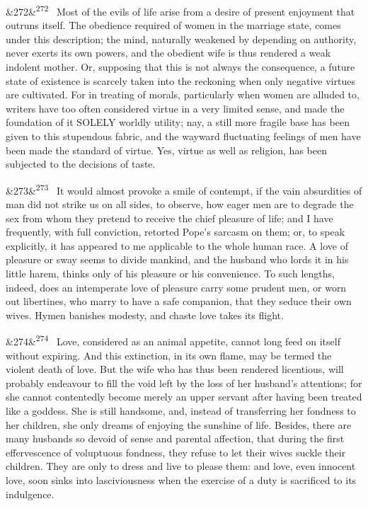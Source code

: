 \documentclass[12pt]{article}
\newcommand{\para}[1][]{\par\noindent\ifx&#1&\else\textsuperscript{\footnotesize #1}~\fi}
\begin{document}
\para[272] Most of the evils of life arise from a desire of present enjoyment that outruns itself. The obedience required of women in the marriage state, comes under this description; the mind, naturally weakened by depending on authority, never exerts its own powers, and the obedient wife is thus rendered a weak indolent mother. Or, supposing that this is not always the consequence, a future state of existence is scarcely taken into the reckoning when only negative virtues are cultivated. For in treating of morals, particularly when women are alluded to, writers have too often considered virtue in a very limited sense, and made the foundation of it SOLELY worldly utility; nay, a still more fragile base has been given to this stupendous fabric, and the wayward fluctuating feelings of men have been made the standard of virtue. Yes, virtue as well as religion, has been subjected to the decisions of taste.

\para[273] It would almost provoke a smile of contempt, if the vain absurdities of man did not strike us on all sides, to observe, how eager men are to degrade the sex from whom they pretend to receive the chief pleasure of life; and I have frequently, with full conviction, retorted Pope's sarcasm on them; or, to speak explicitly, it has appeared to me applicable to the whole human race. A love of pleasure or sway seems to divide mankind, and the husband who lords it in his little harem, thinks only of his pleasure or his convenience. To such lengths, indeed, does an intemperate love of pleasure carry some prudent men, or worn out libertines, who marry to have a safe companion, that they seduce their own wives. Hymen banishes modesty, and chaste love takes its flight.

\para[274] Love, considered as an animal appetite, cannot long feed on itself without expiring. And this extinction, in its own flame, may be termed the violent death of love. But the wife who has thus been rendered licentious, will probably endeavour to fill the void left by the loss of her husband's attentions; for she cannot contentedly become merely an upper servant after having been treated like a goddess. She is still handsome, and, instead of transferring her fondness to her children, she only dreams of enjoying the sunshine of life. Besides, there are many husbands so devoid of sense and parental affection, that during the first effervescence of voluptuous fondness, they refuse to let their wives suckle their children. They are only to dress and live to please them: and love, even innocent love, soon sinks into lasciviousness when the exercise of a duty is sacrificed to its indulgence.
\end{document}
